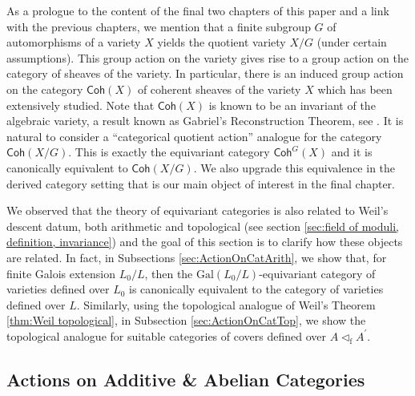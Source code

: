 \documentclass[10pt]{amsart}
\theoremstyle{definition}
\newcommand{\Gal}{{ \mathrm{Gal}}}
\begin{document}
As a prologue to the content of the final two chapters of this paper and a link with the previous chapters, we mention that a finite subgroup $G$ of automorphisms of a variety $X$ yields the quotient variety $X/G$ (under certain assumptions).
This group action on the variety gives rise to a group action on the category of sheaves of the variety. In particular, there is an induced group action on the category $\mathsf{Coh}(X)$ of coherent sheaves of the variety $X$ which has been extensively studied. Note that $\mathsf{Coh}(X)$ is known to be an invariant of the algebraic variety, a result known as Gabriel's Reconstruction Theorem, see \cite{MR232821}. It is natural to consider a ``categorical quotient action'' analogue for the category $\mathsf{Coh}(X/G)$. This is exactly the equivariant category $\mathsf{Coh}^G(X)$ and it is canonically equivalent to $\mathsf{Coh}(X/G)$. We also upgrade this equivalence in the derived category setting that is our main object of interest in the final chapter.

We observed that the theory of equivariant categories is also related to Weil's descent datum, both arithmetic and topological (see section \ref{sec:field of moduli, definition, invariance}) and the goal of this section is to clarify how these objects are related. In fact, in Subsections \ref{sec:ActionOnCatArith}, we show that, for finite Galois extension $L_0/L$, then the $\Gal (L_0 /L) $-equivariant category of varieties defined over $L_0$ is canonically equivalent to the category of varieties defined over $L$. Similarly, using the topological analogue of Weil's Theorem \ref{thm:Weil topological}, in Subsection \ref{sec:ActionOnCatTop}, we show the topological analogue for suitable categories of covers defined over $A \lhd_{\mathrm{f}} A^\prime$.


\subsection{Actions on Additive \& Abelian Categories}
\end{document}

